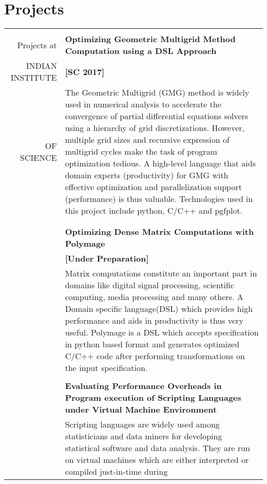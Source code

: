 \documentclass[a4paper,10pt]{article} %
\begin{document}
\section{Projects}
\begin{tabular}{rp{13cm}}
&\\
Projects at & \textbf{Optimizing Geometric Multigrid Method Computation using a DSL Approach} \\
INDIAN INSTITUTE & \hspace{25em} \textbf{[SC 2017]} \\
OF SCIENCE 
& \setlength{\leftskip}{0.4cm}
The Geometric Multigrid (GMG) method is widely used in numerical analysis to accelerate the convergence of partial differential equations solvers using
a hierarchy of grid discretizations. However, multiple grid sizes and recursive 
expression of multigrid cycles make the task of program optimization tedious.
A high-level language that aids domain experts (productivity) for GMG with
effective optimization and parallelization support (performance) is thus
valuable. Technologies used in this project include python, C/C++ and pgfplot.\\
& \\
& \\
& \textbf{Optimizing Dense Matrix Computations with Polymage } \\
& \hspace{25em} \textbf{[Under Preparation]}\\
& \setlength{\leftskip}{0.4cm}
Matrix computations constitute an important part in domains like digital signal
processing, scientific computing, media processing and many others. A Domain
specific language(DSL) which provides high performance and aids in productivity is
thus very useful. Polymage is a DSL which accepts specification in python based
format and generates optimized C/C++ code after performing transformations on
the input specification.\\
&\\
& \textbf{Evaluating Performance Overheads in Program execution of Scripting Languages under Virtual Machine Environment} \\
& \setlength{\leftskip}{0.4cm}
Scripting languages are widely used among statisticians and data miners for
developing statistical software and data analysis. They are run on virtual
machines which are either interpreted or compiled just-in-time during

\end{tabular}
\end{document}
